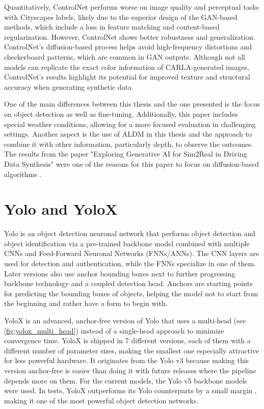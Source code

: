Quantitatively, ControlNet performs worse on image quality and perceptual tasks with Cityscapes labels, likely due to the superior design of the GAN-based methods, which include a loss in feature matching and content-based regularization. However, ControlNet shows better robustness and generalization. ControlNet's diffusion-based process helps avoid high-frequency distortions and checkerboard patterns, which are common in GAN outputs. Although not all models can replicate the exact color information of CARLA-generated images, ControlNet's results highlight its potential for improved texture and structural accuracy when generating synthetic data.

One of the main differences between this thesis and the one presented is the focus on object detection as well as fine-tuning. Additionally, this paper includes special weather conditions, allowing for a more focused evaluation in challenging settings. Another aspect is the use of ALDM in this thesis and the approach to combine it with other information, particularly depth, to observe the outcomes. The results from the paper "Exploring Generative AI for Sim2Real in Driving Data Synthesis" were one of the reasons for this paper to focus on diffusion-based algorithms \cite{zhao2024exploring}.

\section{Yolo and YoloX}
Yolo \cite{redmon2016lookonceunifiedrealtime} is an object detection neuronal network that performs object detection and object identification via a pre-trained backbone model combined with multiple CNNs and Feed-Forward Neuronal Networks (FNNs/ANNs). The CNN layers are used for detection and authentication, while the FNNs specialize in one of them. Later versions also use anchor bounding boxes next to further progressing backbone technology and a coupled detection head. Anchors are starting points for predicting the bounding boxes of objects, helping the model not to start from the beginning and rather have a form to begin with.


YoloX \cite{yolox2021} is an advanced, anchor-free version of Yolo that uses a multi-head (see \autoref{fig:yolox_multi_head}) instead of a single-head approach to minimize convergence time. YoloX is shipped in 7 different versions, each of them with a different number of parameter sizes, making the smallest one especially attractive for less powerful hardware. It originates from the Yolo v3 because making this version anchor-free is easier than doing it with future releases where the pipeline depends more on them. For the current models, the Yolo v5 backbone models were used. In tests, YoloX outperforms its Yolo counterparts by a small margin \cite{yolox2021}, making it one of the most powerful object detection networks. 

